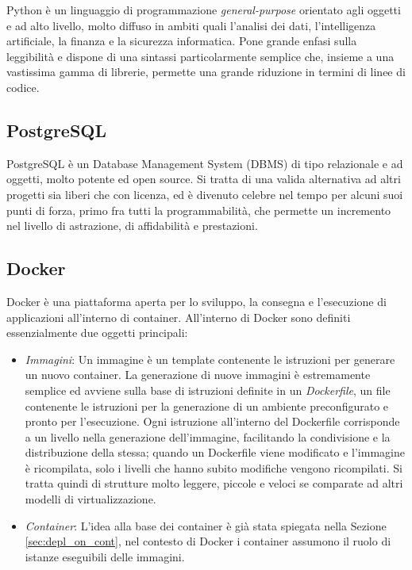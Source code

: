 	Python è un linguaggio di programmazione \emph{general-purpose} orientato agli oggetti e ad alto livello, molto diffuso in ambiti quali l'analisi dei dati, l'intelligenza artificiale, la finanza e la sicurezza informatica\cite[7-8]{book:lutz-python}.
	Pone grande enfasi sulla leggibilità e dispone di una sintassi particolarmente semplice che, insieme a una vastissima gamma di librerie, permette una grande riduzione in termini di linee di codice\cite{wiki:python}.
	
	
\subsection{PostgreSQL}
	
	PostgreSQL è un Database Management System (DBMS) di tipo relazionale e ad oggetti, molto potente ed open source.
	Si tratta di una valida alternativa ad altri progetti sia liberi che con licenza, ed è divenuto celebre nel tempo per alcuni suoi punti di forza, primo fra tutti la programmabilità, che permette un incremento nel livello di astrazione, di affidabilità e prestazioni\cite{doc:postgresql, wiki:postgresql}.


\subsection{Docker}
	
	Docker è una piattaforma aperta per lo sviluppo, la consegna e l'esecuzione di applicazioni all'interno di container.
	All'interno di Docker sono definiti essenzialmente due oggetti principali:
	
	\begin{itemize}
		\item \emph{Immagini}:
			Un immagine è un template contenente le istruzioni per generare un nuovo container.
			La generazione di nuove immagini è estremamente semplice ed avviene sulla base di istruzioni definite in un \emph{Dockerfile}, un file contenente le istruzioni per la generazione di un ambiente preconfigurato e pronto per l'esecuzione.
			Ogni istruzione all'interno del Dockerfile corrisponde a un livello nella generazione dell'immagine, facilitando la condivisione e la distribuzione della stessa; quando un Dockerfile viene modificato e l'immagine è ricompilata, solo i livelli che hanno subito modifiche vengono ricompilati.
			Si tratta quindi di strutture molto leggere, piccole e veloci se comparate ad altri modelli di virtualizzazione\cite{doc:docker-overview}.
			
		\item \emph{Container}:
			L'idea alla base dei container è già stata spiegata nella Sezione \ref{sec:depl_on_cont},
			nel contesto di Docker i container assumono il ruolo di istanze eseguibili delle immagini\cite{doc:docker-overview}.
	\end{itemize}
	
